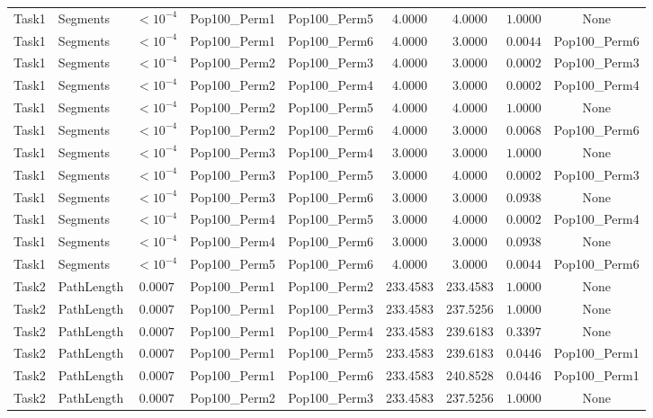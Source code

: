 \documentclass[8pt]{article}
\begin{document}
\begin{longtable}{llccccccc}
Task1 & Segments & $< 10^{-4}$ & Pop100\_Perm1 & Pop100\_Perm5 & 4.0000 & 4.0000 & $1.0000$ & None \\
Task1 & Segments & $< 10^{-4}$ & Pop100\_Perm1 & Pop100\_Perm6 & 4.0000 & 3.0000 & $0.0044$ & Pop100\_Perm6 \\
Task1 & Segments & $< 10^{-4}$ & Pop100\_Perm2 & Pop100\_Perm3 & 4.0000 & 3.0000 & $0.0002$ & Pop100\_Perm3 \\
Task1 & Segments & $< 10^{-4}$ & Pop100\_Perm2 & Pop100\_Perm4 & 4.0000 & 3.0000 & $0.0002$ & Pop100\_Perm4 \\
Task1 & Segments & $< 10^{-4}$ & Pop100\_Perm2 & Pop100\_Perm5 & 4.0000 & 4.0000 & $1.0000$ & None \\
Task1 & Segments & $< 10^{-4}$ & Pop100\_Perm2 & Pop100\_Perm6 & 4.0000 & 3.0000 & $0.0068$ & Pop100\_Perm6 \\
Task1 & Segments & $< 10^{-4}$ & Pop100\_Perm3 & Pop100\_Perm4 & 3.0000 & 3.0000 & $1.0000$ & None \\
Task1 & Segments & $< 10^{-4}$ & Pop100\_Perm3 & Pop100\_Perm5 & 3.0000 & 4.0000 & $0.0002$ & Pop100\_Perm3 \\
Task1 & Segments & $< 10^{-4}$ & Pop100\_Perm3 & Pop100\_Perm6 & 3.0000 & 3.0000 & $0.0938$ & None \\
Task1 & Segments & $< 10^{-4}$ & Pop100\_Perm4 & Pop100\_Perm5 & 3.0000 & 4.0000 & $0.0002$ & Pop100\_Perm4 \\
Task1 & Segments & $< 10^{-4}$ & Pop100\_Perm4 & Pop100\_Perm6 & 3.0000 & 3.0000 & $0.0938$ & None \\
Task1 & Segments & $< 10^{-4}$ & Pop100\_Perm5 & Pop100\_Perm6 & 4.0000 & 3.0000 & $0.0044$ & Pop100\_Perm6 \\
Task2 & PathLength & $0.0007$ & Pop100\_Perm1 & Pop100\_Perm2 & 233.4583 & 233.4583 & $1.0000$ & None \\
Task2 & PathLength & $0.0007$ & Pop100\_Perm1 & Pop100\_Perm3 & 233.4583 & 237.5256 & $1.0000$ & None \\
Task2 & PathLength & $0.0007$ & Pop100\_Perm1 & Pop100\_Perm4 & 233.4583 & 239.6183 & $0.3397$ & None \\
Task2 & PathLength & $0.0007$ & Pop100\_Perm1 & Pop100\_Perm5 & 233.4583 & 239.6183 & $0.0446$ & Pop100\_Perm1 \\
Task2 & PathLength & $0.0007$ & Pop100\_Perm1 & Pop100\_Perm6 & 233.4583 & 240.8528 & $0.0446$ & Pop100\_Perm1 \\
Task2 & PathLength & $0.0007$ & Pop100\_Perm2 & Pop100\_Perm3 & 233.4583 & 237.5256 & $1.0000$ & None \\

\end{longtable}
\end{document}
